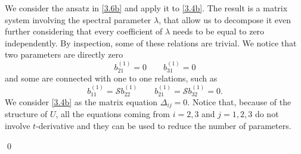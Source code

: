 \documentclass[fleqn,11pt,twoside]{article}
\makeatletter
\renewenvironment{proof}[1][\proofname]{\par
  \normalfont
  \topsep6\p@\@plus6\p@ \trivlist
  \item[\hskip\labelsep\textbf{%
    #1\@addpunct{.}}]\ignorespaces
}{%
  \qed\endtrivlist
}
\theoremstyle{definition}
\makeatother
\begin{document}
	\begin{proof}
		We consider the ansatz in \eqref{3.6b} and apply it to
\eqref{3.4b}. The result is a matrix system involving the spectral parameter
$\lambda$, that allow us to decompose it even further considering that every
coefficient of $\lambda$ needs to be equal to zero independently. By inspection,
some of these relations are trivial. We notice that two parameters are
directly zero
		\begin{equation}
			b_{21}^{(1)}=0 \qquad b_{31}^{(1)}=0
			\label{5.2}
		\end{equation}
		and some are connected with one to one relations, such as
		\begin{equation}
			b^{(1)}_{11}= \mathcal{S} b^{(1)}_{22} \qquad
b^{(1)}_{21}=\mathcal{S}b^{(1)}_{32}=0 .
			\label{5.3}
		\end{equation}
We consider \eqref{3.4b} as the matrix equation $\Delta_{
ij}=0$. Notice that, because of the structure of $U$, all the
equations coming from $i=2, 3$ and $j=1, 2, 3$ do not involve
$t$-derivative and they can be used to reduce the number of parameters.


\end{proof}
\end{document}
